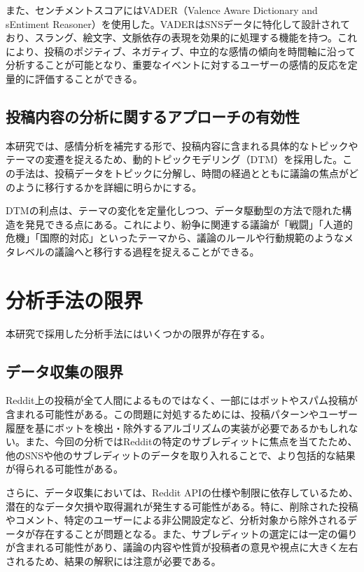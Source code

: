 \documentclass[11pt, a4j]{jreport}
\begin{document}
    また、センチメントスコアにはVADER（Valence Aware Dictionary and sEntiment Reasoner）を使用した。VADERはSNSデータに特化して設計されており、スラング、絵文字、文脈依存の表現を効果的に処理する機能を持つ。これにより、投稿のポジティブ、ネガティブ、中立的な感情の傾向を時間軸に沿って分析することが可能となり、重要なイベントに対するユーザーの感情的反応を定量的に評価することができる。

    \subsection{投稿内容の分析に関するアプローチの有効性}
    本研究では、感情分析を補完する形で、投稿内容に含まれる具体的なトピックやテーマの変遷を捉えるため、動的トピックモデリング（DTM）を採用した。この手法は、投稿データをトピックに分解し、時間の経過とともに議論の焦点がどのように移行するかを詳細に明らかにする。

    DTMの利点は、テーマの変化を定量化しつつ、データ駆動型の方法で隠れた構造を発見できる点にある。これにより、紛争に関連する議論が「戦闘」「人道的危機」「国際的対応」といったテーマから、議論のルールや行動規範のようなメタレベルの議論へと移行する過程を捉えることができる。

    \section{分析手法の限界}
    本研究で採用した分析手法にはいくつかの限界が存在する。
    
    \subsection{データ収集の限界}
    Reddit上の投稿が全て人間によるものではなく、一部にはボットやスパム投稿が含まれる可能性がある。この問題に対処するためには、投稿パターンやユーザー履歴を基にボットを検出・除外するアルゴリズムの実装が必要であるかもしれない。また、今回の分析ではRedditの特定のサブレディットに焦点を当てたため、他のSNSや他のサブレディットのデータを取り入れることで、より包括的な結果が得られる可能性がある。
    
    さらに、データ収集においては、Reddit APIの仕様や制限に依存しているため、潜在的なデータ欠損や取得漏れが発生する可能性がある。特に、削除された投稿やコメント、特定のユーザーによる非公開設定など、分析対象から除外されるデータが存在することが問題となる。また、サブレディットの選定には一定の偏りが含まれる可能性があり、議論の内容や性質が投稿者の意見や視点に大きく左右されるため、結果の解釈には注意が必要である。
    
\end{document}
